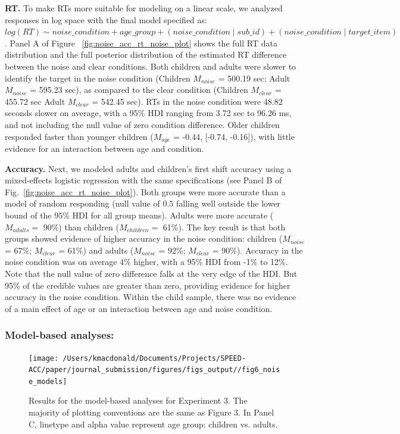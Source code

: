 \documentclass[english,floatsintext,man]{apa6}
\begin{document}
\textbf{RT.} To make RTs more suitable for modeling on a linear scale,
we analyzed responses in log space with the final model specified as:
\texttt{$log(RT) \sim noise\_condition + age\_group + (noise\_condition \mid sub\_id ) + (noise\_condition \mid target\_item)$}.
Panel A of Figure ~\ref{fig:noise_acc_rt_noise_plot} shows the full RT
data distribution and the full posterior distribution of the estimated
RT difference between the noise and clear conditions. Both children and
adults were slower to identify the target in the noise condition
(Children \(M_{noise}\) = 500.19 sec; Adult \(M_{noise}\) = 595.23 sec),
as compared to the clear condition (Children \(M_{clear}\) = 455.72 sec
Adult \(M_{clear}\) = 542.45 sec). RTs in the noise condition were 48.82
seconds slower on average, with a 95\% HDI ranging from 3.72 sec to
96.26 ms, and not including the null value of zero condition difference.
Older children responded faster than younger children (\(M_{age}\) =
-0.44, {[}-0.74, -0.16{]}), with little evidence for an interaction
between age and condition.

\textbf{Accuracy.} Next, we modeled adults and children's first shift
accuracy using a mixed-effects logistic regression with the same
specifications (see Panel B of Fig.~\ref{fig:noise_acc_rt_noise_plot}).
Both groups were more accurate than a model of random responding (null
value of \(0.5\) falling well outside the lower bound of the 95\% HDI
for all group means). Adults were more accurate (\(M_{adults} =\) 90\%)
than children (\(M_{children} =\) 61\%). The key result is that both
groups showed evidence of higher accuracy in the noise condition:
children (\(M_{noise}\) = 67\%; \(M_{clear}\) = 61\%) and adults
(\(M_{noise}\) = 92\%; \(M_{clear}\) = 90\%). Accuracy in the noise
condition was on average 4\% higher, with a 95\% HDI from -1\% to 12\%.
Note that the null value of zero difference falls at the very edge of
the HDI. But 95\% of the credible values are greater than zero,
providing evidence for higher accuracy in the noise condition. Within
the child sample, there was no evidence of a main effect of age or an
interaction between age and noise condition.

\hypertarget{model-based-analyses-2}{%
\subsubsection{Model-based analyses:}\label{model-based-analyses-2}}

\begin{figure}[!t]

{\centering \texttt{[image: /Users/kmacdonald/Documents/Projects/SPEED-ACC/paper/journal\_submission/figures/figs\_output//fig6\_noise\_models]} 

}

\caption{Results for the model-based analyses for Experiment 3. The majority of plotting conventions are the same as Figure 3. In Panel C, linetype and alpha value represent age group: children vs. adults.}\label{fig:noise-model-plots}
\end{figure}
\end{document}
